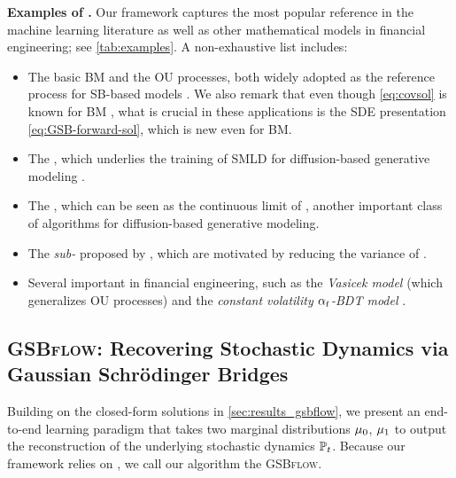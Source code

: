 \textbf{Examples of .}
Our framework captures the most popular reference  in the machine learning literature as well as other mathematical models in financial engineering; see \cref{tab:examples}. %
A non-exhaustive list includes:
\begin{itemize}[leftmargin=.5cm,itemsep=.01cm,topsep=0cm]
\item The basic \acrfull{BM} and the \acrfull{OU} processes, both widely adopted as the reference process for \acrshort{SB}-based models \citep{de2021simulating, de2021diffusion, lavenant2021towards, vargas2021solving, wang2021deep}. We also remark that even though \eqref{eq:covsol} is known for \acrshort{BM} \citep{mallasto2021entropy}, what is crucial in these applications is the \acrshort{SDE} presentation \eqref{eq:GSB-forward-sol}, which is new even for BM.
\item The , which underlies the training of \acrlong{SMLD} for diffusion-based generative modeling \citep{huang2021variational, song2019generative, song2020score}.
\item The , which can be seen as the continuous limit of  \citep{ho2020denoising, sohl2015deep, song2020score}, another important class of algorithms for diffusion-based generative modeling.
\item The \emph{sub-} proposed by \citep{song2020score}, which are motivated by reducing the variance of .
\item Several important  in financial engineering, such as the \emph{Vasicek model} (which generalizes \acrshort{OU} processes) and the \emph{constant volatility $\alpha_{ t }$-\acrfull{BDT} model} \citep{platen2010numerical}. 
\end{itemize}

\subsection{\textsc{GSBflow}: Recovering Stochastic Dynamics via Gaussian Schr{\"o}dinger Bridges}

Building on the closed-form solutions in \cref{sec:results_gsbflow}, we present an end-to-end learning paradigm that takes two marginal distributions $\mu_0$, $\mu_1$ to output the reconstruction of the underlying stochastic dynamics $\mathbb{P}_{{t}}$. Because our framework relies on , we call our algorithm the \textsc{GSBflow}. \\

